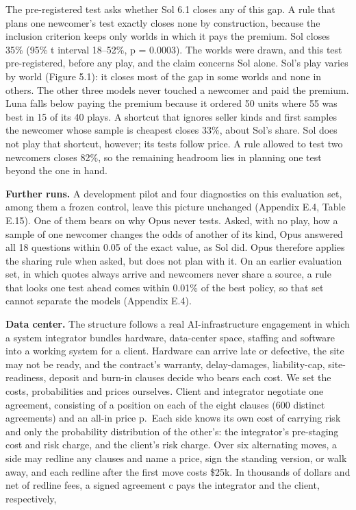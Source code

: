 The pre-registered test asks whether Sol 6.1 closes any of this gap. A rule that plans one newcomer's test exactly
closes none by construction, because the inclusion criterion keeps only worlds in which it pays the premium. Sol
closes 35\% (95\% t interval 18--52\%, p = 0.0003). The worlds were drawn, and this test pre-registered, before any play, and the claim concerns Sol
alone. Sol's play varies by world (Figure 5.1): it closes most of the gap in some worlds and none in others. The
other three models never touched a newcomer and paid the premium. Luna falls below paying the premium because it
ordered 50 units where 55 was best in 15 of its 40 plays. A shortcut that ignores seller kinds and first samples the
newcomer whose sample is cheapest closes 33\%, about Sol's share. Sol does not play that shortcut, however; its tests
follow price. A rule allowed to test two newcomers closes 82\%, so the remaining headroom lies in planning one test
beyond the one in hand.

\textbf{Further runs.} A development pilot and four diagnostics on this evaluation set, among them a frozen
control, leave this picture unchanged (Appendix E.4, Table E.15). One of them bears on why Opus never tests. Asked,
with no play, how a sample of one newcomer changes the odds of another of its kind, Opus answered all 18 questions
within 0.05 of the exact value, as Sol did. Opus therefore applies the sharing rule when asked, but does not plan with
it. On an earlier evaluation set, in which quotes always arrive and newcomers never share a source, a rule that looks
one test ahead comes within 0.01\% of the best policy, so that set cannot separate the models (Appendix E.4).

\textbf{Data center.} The structure follows a real AI-infrastructure engagement in which a system integrator bundles
hardware, data-center space, staffing and software into a working system for a client. Hardware can arrive late or
defective, the site may not be ready, and the contract's warranty, delay-damages, liability-cap, site-readiness,
deposit and burn-in clauses decide who bears each cost. We set the costs, probabilities and prices ourselves. Client
and integrator negotiate one agreement, consisting of a position on each of the eight clauses (600 distinct
agreements) and an all-in price p.~Each side knows its own cost of carrying risk and only the probability distribution
of the other's: the integrator's pre-staging cost and risk charge, and the client's risk charge. Over six alternating
moves, a side may redline any clauses and name a price, sign the standing version, or walk away, and each redline
after the first move costs \$25k. In thousands of dollars and net of redline fees, a signed agreement c pays the
integrator and the client, respectively,


